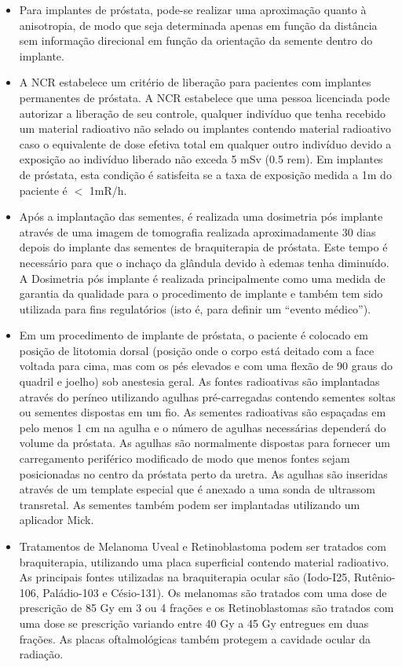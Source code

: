 \documentclass[11pt,a4paper]{article}
\newcounter{exemplo}
\begin{document}
\begin{exemplo}[8. Braquiterapia]
\begin{itemize}
        \item Para implantes de próstata, pode-se realizar uma aproximação quanto à anisotropia, de modo que seja determinada apenas em função da distância sem informação direcional em função da orientação da semente dentro do implante.
        
        \item A NCR estabelece um critério de liberação para pacientes com implantes permanentes de próstata. A NCR estabelece que uma pessoa licenciada pode autorizar a liberação de seu controle, qualquer indivíduo que tenha recebido um material radioativo não selado ou implantes contendo material radioativo caso o equivalente de dose efetiva total em qualquer outro indivíduo devido a exposição ao indivíduo liberado não exceda 5 mSv (0.5 rem). Em implantes de próstata, esta condição é satisfeita se a taxa de exposição medida a 1m do paciente é $<$ 1mR/h.

        \item Após a implantação das sementes, é realizada uma dosimetria pós implante através de uma imagem de tomografia realizada aproximadamente 30 dias depois do implante das sementes de braquiterapia de próstata. Este tempo é necessário para que o inchaço da glândula devido à edemas tenha diminuído. A Dosimetria pós implante é realizada principalmente como uma medida de garantia da qualidade para o procedimento de implante e também tem sido utilizada para fins regulatórios (isto é, para definir um ``evento médico'').
        
        \item Em um procedimento de implante de próstata, o paciente é colocado em posição de litotomia dorsal (posição onde o corpo está deitado com a face voltada para cima, mas com os pés elevados e com uma flexão de 90 graus do quadril e joelho) sob anestesia geral. As fontes radioativas são implantadas através do períneo utilizando agulhas pré-carregadas contendo sementes soltas ou sementes dispostas em um fio. As sementes radioativas são espaçadas em pelo menos 1 cm na agulha e o número de agulhas necessárias dependerá do volume da próstata. As agulhas são normalmente dispostas para fornecer um carregamento periférico modificado de modo que menos fontes sejam posicionadas no centro da próstata perto da uretra. As agulhas são inseridas através de um template especial que é anexado a uma sonda de ultrassom transretal. As sementes também podem ser implantadas utilizando um aplicador Mick.
        
        \item Tratamentos de Melanoma Uveal e Retinoblastoma podem ser tratados com braquiterapia, utilizando uma placa superficial contendo material radioativo. As principais fontes utilizadas na braquiterapia ocular são (Iodo-I25, Rutênio-106, Paládio-103 e Césio-131). Os melanomas são tratados com uma dose de prescrição de 85 Gy em 3 ou 4 frações e os Retinoblastomas são tratados com uma dose se prescrição variando entre 40 Gy a 45 Gy entregues em duas frações. As placas oftalmológicas também protegem a cavidade ocular da radiação. 
        

\end{itemize}
\end{exemplo}
\end{document}
